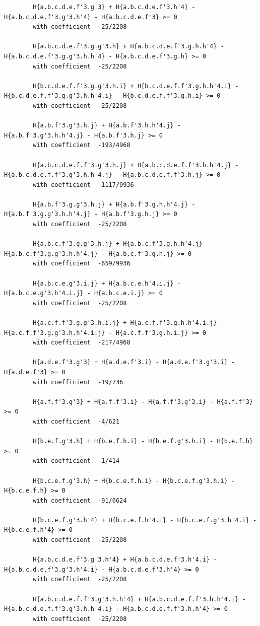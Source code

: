 \documentclass[11pt, a4paper]{kybernetika}
\begin{document}
\begin{verbatim}
		H{a.b.c.d.e.f'3.g'3} + H{a.b.c.d.e.f'3.h'4} - H{a.b.c.d.e.f'3.g'3.h'4} - H{a.b.c.d.e.f'3} >= 0
		with coefficient  -25/2208
		
		H{a.b.c.d.e.f'3.g.g'3.h} + H{a.b.c.d.e.f'3.g.h.h'4} - H{a.b.c.d.e.f'3.g.g'3.h.h'4} - H{a.b.c.d.e.f'3.g.h} >= 0
		with coefficient  -25/2208
		
		H{b.c.d.e.f.f'3.g.g'3.h.i} + H{b.c.d.e.f.f'3.g.h.h'4.i} - H{b.c.d.e.f.f'3.g.g'3.h.h'4.i} - H{b.c.d.e.f.f'3.g.h.i} >= 0
		with coefficient  -25/2208
		
		H{a.b.f'3.g'3.h.j} + H{a.b.f'3.h.h'4.j} - H{a.b.f'3.g'3.h.h'4.j} - H{a.b.f'3.h.j} >= 0
		with coefficient  -193/4968
		
		H{a.b.c.d.e.f.f'3.g'3.h.j} + H{a.b.c.d.e.f.f'3.h.h'4.j} - H{a.b.c.d.e.f.f'3.g'3.h.h'4.j} - H{a.b.c.d.e.f.f'3.h.j} >= 0
		with coefficient  -1117/9936
		
		H{a.b.f'3.g.g'3.h.j} + H{a.b.f'3.g.h.h'4.j} - H{a.b.f'3.g.g'3.h.h'4.j} - H{a.b.f'3.g.h.j} >= 0
		with coefficient  -25/2208
		
		H{a.b.c.f'3.g.g'3.h.j} + H{a.b.c.f'3.g.h.h'4.j} - H{a.b.c.f'3.g.g'3.h.h'4.j} - H{a.b.c.f'3.g.h.j} >= 0
		with coefficient  -659/9936
		
		H{a.b.c.e.g'3.i.j} + H{a.b.c.e.h'4.i.j} - H{a.b.c.e.g'3.h'4.i.j} - H{a.b.c.e.i.j} >= 0
		with coefficient  -25/2208
		
		H{a.c.f.f'3.g.g'3.h.i.j} + H{a.c.f.f'3.g.h.h'4.i.j} - H{a.c.f.f'3.g.g'3.h.h'4.i.j} - H{a.c.f.f'3.g.h.i.j} >= 0
		with coefficient  -217/4968
		
		H{a.d.e.f'3.g'3} + H{a.d.e.f'3.i} - H{a.d.e.f'3.g'3.i} - H{a.d.e.f'3} >= 0
		with coefficient  -19/736
		
		H{a.f.f'3.g'3} + H{a.f.f'3.i} - H{a.f.f'3.g'3.i} - H{a.f.f'3} >= 0
		with coefficient  -4/621
		
		H{b.e.f.g'3.h} + H{b.e.f.h.i} - H{b.e.f.g'3.h.i} - H{b.e.f.h} >= 0
		with coefficient  -1/414
		
		H{b.c.e.f.g'3.h} + H{b.c.e.f.h.i} - H{b.c.e.f.g'3.h.i} - H{b.c.e.f.h} >= 0
		with coefficient  -91/6624
		
		H{b.c.e.f.g'3.h'4} + H{b.c.e.f.h'4.i} - H{b.c.e.f.g'3.h'4.i} - H{b.c.e.f.h'4} >= 0
		with coefficient  -25/2208
		
		H{a.b.c.d.e.f'3.g'3.h'4} + H{a.b.c.d.e.f'3.h'4.i} - H{a.b.c.d.e.f'3.g'3.h'4.i} - H{a.b.c.d.e.f'3.h'4} >= 0
		with coefficient  -25/2208
		
		H{a.b.c.d.e.f.f'3.g'3.h.h'4} + H{a.b.c.d.e.f.f'3.h.h'4.i} - H{a.b.c.d.e.f.f'3.g'3.h.h'4.i} - H{a.b.c.d.e.f.f'3.h.h'4} >= 0
		with coefficient  -25/2208
		

\end{verbatim}
\end{document}
